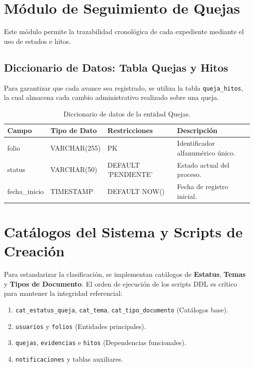 \section{Módulo de Seguimiento de Quejas}
Este módulo permite la trazabilidad cronológica de cada expediente mediante el uso de estados e hitos.

\subsection{Diccionario de Datos: Tabla Quejas y Hitos}
Para garantizar que cada avance sea registrado, se utiliza la tabla \texttt{queja\_hitos}, la cual almacena cada cambio administrativo realizado sobre una queja.

\begin{table}[H]
\centering
\small
\begin{tabularx}{\textwidth}{|l|l|l|X|}
\hline
\rowcolor{azulESCOM} 
\color{white}\textbf{Campo} & \color{white}\textbf{Tipo de Dato} & \color{white}\textbf{Restricciones} & \color{white}\textbf{Descripción} \\ \hline
folio & VARCHAR(255) & PK & Identificador alfanumérico único. \\ \hline
status & VARCHAR(50) & DEFAULT 'PENDIENTE' & Estado actual del proceso. \\ \hline
fecha\_inicio & TIMESTAMP & DEFAULT NOW() & Fecha de registro inicial. \\ \hline
\end{tabularx}
\caption{Diccionario de datos de la entidad Quejas.}
\end{table}

\section{Catálogos del Sistema y Scripts de Creación}
Para estandarizar la clasificación, se implementan catálogos de \textbf{Estatus}, \textbf{Temas} y \textbf{Tipos de Documento}. El orden de ejecución de los scripts DDL es crítico para mantener la integridad referencial:

\begin{enumerate}
    \item \texttt{cat\_estatus\_queja}, \texttt{cat\_tema}, \texttt{cat\_tipo\_documento} (Catálogos base).
    \item \texttt{usuarios} y \texttt{folios} (Entidades principales).
    \item \texttt{quejas}, \texttt{evidencias} e \texttt{hitos} (Dependencias funcionales).
    \item \texttt{notificaciones} y tablas auxiliares.
\end{enumerate}

\begin{center}
\end{center}